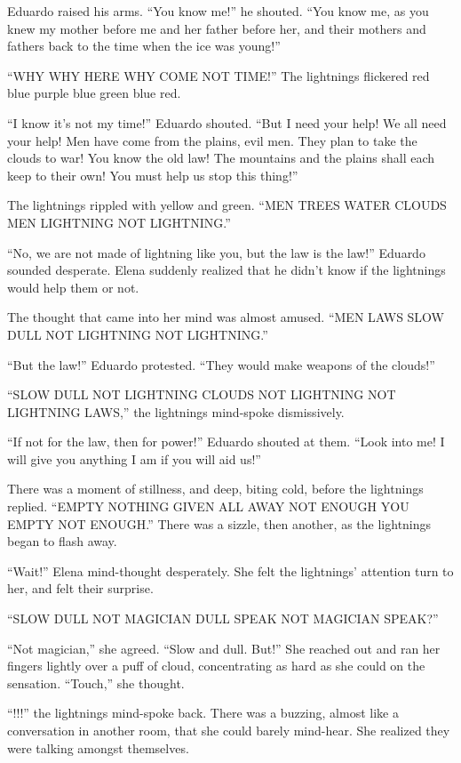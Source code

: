 \documentclass[10pt]{book}
\begin{document}
Eduardo raised his arms. ``You know me!'' he shouted. ``You know me, as you knew my mother before me and her father before her, and their mothers and fathers back to the time when the ice was young!''

``WHY WHY HERE WHY COME NOT TIME!'' The lightnings flickered red blue purple blue green blue red.

``I know it's not my time!'' Eduardo shouted. ``But I need your help! We all need your help! Men have come from the plains, evil men. They plan to take the clouds to war! You know the old law! The mountains and the plains shall each keep to their own! You must help us stop this thing!''

The lightnings rippled with yellow and green. ``MEN TREES WATER CLOUDS MEN LIGHTNING NOT LIGHTNING.''

``No, we are not made of lightning like you, but the law is the law!'' Eduardo sounded desperate. Elena suddenly realized that he didn't know if the lightnings would help them or not.

The thought that came into her mind was almost amused. ``MEN LAWS SLOW DULL NOT LIGHTNING NOT LIGHTNING.''

``But the law!'' Eduardo protested. ``They would make weapons of the clouds!''

``SLOW DULL NOT LIGHTNING CLOUDS NOT LIGHTNING NOT LIGHTNING LAWS,'' the lightnings mind-spoke dismissively.

``If not for the law, then for power!'' Eduardo shouted at them. ``Look into me! I will give you anything I am if you will aid us!''

There was a moment of stillness, and deep, biting cold, before the lightnings replied. ``EMPTY NOTHING GIVEN ALL AWAY NOT ENOUGH YOU EMPTY NOT ENOUGH.'' There was a sizzle, then another, as the lightnings began to flash away.

``Wait!'' Elena mind-thought desperately. She felt the lightnings' attention turn to her, and felt their surprise.

``SLOW DULL NOT MAGICIAN DULL SPEAK NOT MAGICIAN SPEAK?''

``Not magician,'' she agreed. ``Slow and dull. But!'' She reached out and ran her fingers lightly over a puff of cloud, concentrating as hard as she could on the sensation. ``Touch,'' she thought.

``!!!'' the lightnings mind-spoke back. There was a buzzing, almost like a conversation in another room, that she could barely mind-hear. She realized they were talking amongst themselves.
\end{document}
